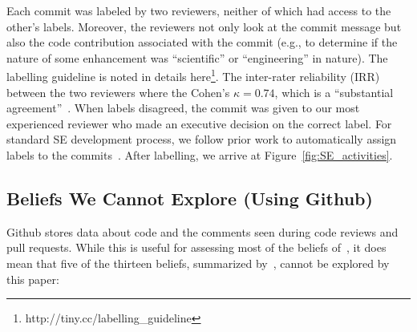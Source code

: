 \documentclass[conference,10pt]{IEEEtran}
\begin{document}
 

Each commit was labeled by two reviewers,
neither of which had access to the other's labels. Moreover, the reviewers not only look at the commit message but also the code contribution associated with the commit (e.g., to determine if the nature of some enhancement was 
``scientific'' or ``engineering'' in nature). The labelling guideline is noted in details here\footnote{http://tiny.cc/labelling\_guideline}. The inter-rater reliability (IRR) between the two reviewers where the Cohen's $\kappa = 0.74$, which is a ``substantial agreement''~\cite{irr_kappa}. When labels disagreed, the commit was given to our most experienced reviewer who made an executive decision on the correct label. For standard SE development process, we follow prior work to automatically assign labels to the commits~\cite{commitguru, Kim08changes, hindle08_largecommits, kamei12_jit}. After labelling, we arrive at Figure~\ref{fig:SE_activities}.

\subsection{Beliefs We Cannot Explore (Using Github)}\label{tion:cannot}

Github stores data about code and the comments seen during code reviews and pull requests. While this is useful for assessing most of the beliefs of~, it does mean that five of the thirteen beliefs, summarized by~\citet{johan18_secs}, cannot be explored by this paper:
\end{document}
